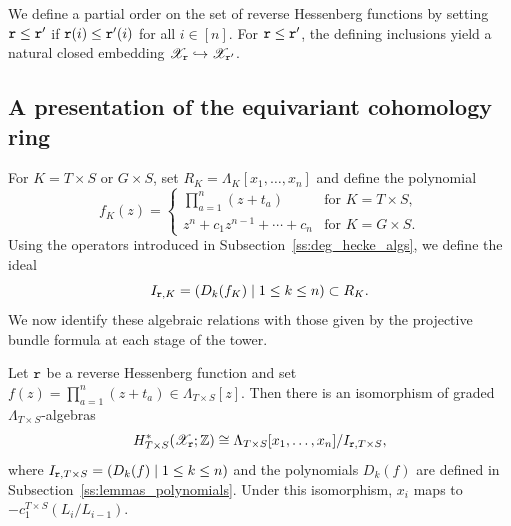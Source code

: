 We define a partial order on the set of reverse Hessenberg functions by setting
$\mathtt r \leq \mathtt r'$ if $\mathtt r(i) \leq \mathtt r'(i)$ for all $i \in [n]$.
For $\mathtt r \leq \mathtt r'$, the defining inclusions yield a natural
closed embedding $\mathscr X_{\mathtt r} \hookrightarrow \mathscr X_{\mathtt r'}$.

\subsection{A presentation of the equivariant cohomology ring}\label{ss:equiv_coho_xpsi}

For $K=T\times S$ or $G\times S$, set $R_K=\Lambda_K[x_1,\dots,x_n]$ and define the polynomial
\[
  f_K(z)=
  \begin{cases}
    \prod_{a=1}^n(z+t_a) & \text{for } K=T\times S,\\
    z^n+c_1z^{n-1}+\cdots+c_n & \text{for } K=G\times S.
  \end{cases}
\]
Using the operators introduced in Subsection~\ref{ss:deg_hecke_algs}, we define the ideal
\[
  I_{\mathtt r,K}=(D_k(f_K)\mid1\leq k\leq n)\subset R_K.
\]
We now identify these algebraic relations with those given by the projective
bundle formula at each stage of the tower.

\begin{theorem}\label{thm:equiv_coho_xdelta}
Let $\mathtt r$ be a reverse Hessenberg function and set
$f(z)=\prod_{a=1}^n(z+t_a)\in\Lambda_{T\times S}[z]$.
Then there is an isomorphism of graded $\Lambda_{T\times S}$-algebras
\[
  H^*_{T\times S}(\mathscr X_{\mathtt r};\mathbb Z) \cong \Lambda_{T\times S}[x_1,\dots,x_n]/I_{\mathtt r,T\times S},
\]
where $I_{\mathtt r,T\times S}=(D_k(f)\mid1\leq k\leq n)$ and the
polynomials $D_k(f)$ are defined in Subsection~\ref{ss:lemmas_polynomials}.
Under this isomorphism, $x_i$ maps to $-c_1^{T\times S}(L_i/L_{i-1})$.
\end{theorem}

